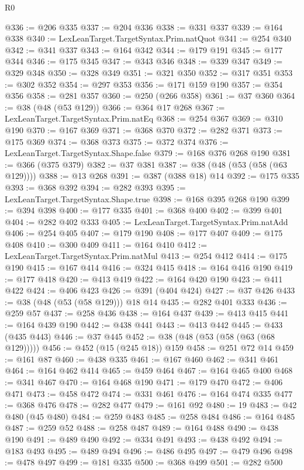 \begin{lexlean}{R0}
\begin{coremodule}
@336 := @206 @335
@337 := @204 @336
@338 := @331 @337
@339 := @164 @338
@340 := LexLeanTarget.TargetSyntax.Prim.natQuot
@341 := @254 @340
@342 := @341 @337
@343 := @164 @342
@344 := @179 @191
@345 := @177 @344
@346 := @175 @345
@347 := @343 @346
@348 := @339 @347
@349 := @329 @348
@350 := @328 @349
@351 := @321 @350
@352 := @317 @351
@353 := @302 @352
@354 := @297 @353
@356 := @171 @159 @190
@357 := @354 @356
@358 := @281 @357
@360 := @250 (@266 @358)
@361 := @37 @360
@364 := @38 (@48 (@53 @129))
@366 := @364 @17 @268
@367 := LexLeanTarget.TargetSyntax.Prim.natEq
@368 := @254 @367
@369 := @310 @190
@370 := @167 @369
@371 := @368 @370
@372 := @282 @371
@373 := @175 @369
@374 := @368 @373
@375 := @372 @374
@376 := LexLeanTarget.TargetSyntax.Shape.false
@379 := @168 @376 @268 @190
@381 := @366 (@375 @379)
@382 := @37 @381
@387 := @38 (@48 (@53 (@58 (@63 @129))))
@388 := @13 @268
@391 := @387 (@388 @18) @14
@392 := @175 @335
@393 := @368 @392
@394 := @282 @393
@395 := LexLeanTarget.TargetSyntax.Shape.true
@398 := @168 @395 @268 @190
@399 := @394 @398
@400 := @177 @335
@401 := @368 @400
@402 := @399 @401
@404 := @282 @402 @333
@405 := LexLeanTarget.TargetSyntax.Prim.natAdd
@406 := @254 @405
@407 := @179 @190
@408 := @177 @407
@409 := @175 @408
@410 := @300 @409
@411 := @164 @410
@412 := LexLeanTarget.TargetSyntax.Prim.natMul
@413 := @254 @412
@414 := @175 @190
@415 := @167 @414
@416 := @324 @415
@418 := @164 @416 @190
@419 := @177 @418
@420 := @413 @419
@422 := @164 @420 @190
@423 := @411 @422
@424 := @406 @423
@426 := @391 (@404 @424)
@427 := @37 @426
@433 := @38 (@48 (@53 (@58 @129))) @18 @14
@435 := @282 @401 @333
@436 := @259 @57
@437 := @258 @436
@438 := @164 @437
@439 := @413 @415
@441 := @164 @439 @190
@442 := @438 @441
@443 := @413 @442
@445 := @433 (@435 @443)
@446 := @37 @445
@452 := @38 (@48 (@53 (@58 (@63 (@68 @129)))))
@456 := @452 (@15 (@245 @18)) @159
@458 := @251 @72 @14
@459 := @161 @87
@460 := @438 @335
@461 := @167 @460
@462 := @341 @461
@464 := @164 @462 @414
@465 := @459 @464
@467 := @164 @465 @400
@468 := @341 @467
@470 := @164 @468 @190
@471 := @179 @470
@472 := @406 @471
@473 := @458 @472
@474 := @331 @461
@476 := @164 @474 @335
@477 := @368 @476
@478 := @282 @477
@479 := @161 @92
@480 := 19
@483 := @42 @480 (@45 @480)
@484 := @259 @483
@485 := @258 @484
@486 := @164 @485
@487 := @259 @52
@488 := @258 @487
@489 := @164 @488
@490 := @438 @190
@491 := @489 @490
@492 := @334 @491
@493 := @438 @492
@494 := @183 @493
@495 := @489 @494
@496 := @486 @495
@497 := @479 @496
@498 := @478 @497
@499 := @181 @335
@500 := @368 @499
@501 := @282 @500

\end{coremodule}
\end{lexlean}
